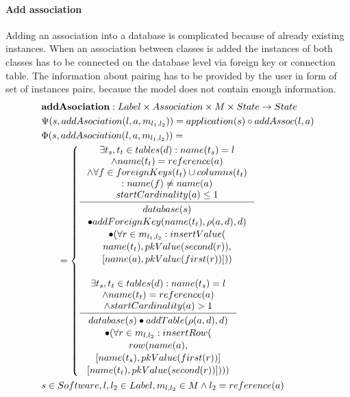 \documentclass[11pt]{article}
\begin{document}
\paragraph{Add association} Adding an association into a database is complicated because of already existing instances. When an association between classes is added the instances of both classes has to be connected on the database level via foreign key or connection table. The information about pairing has to be provided by the user in form of set of instances pairs, because the model does not contain enough information. 
\begin{align*}
& \mathbf{addAsociation} : Label \times Association \times M \times State \rightarrow State \\
& \Psi(s, addAsociation(l, a, m_{l_1, l_2})) = application(s) \circ addAssoc(l, a) \\
& \Phi(s, addAsociation(l, a, m_{l_1, l_2})) = \\
& \;\;\;\;\;\; = \begin{cases}
	\inference{ \exists t_s, t_t \in tables(d) : name(t_s) = l\\ 		\wedge name(t_t) = reference(a) \\ \wedge \forall f \in foreignKeys(t_t) \cup columns(t_t) \\: name(f) \neq name(a) \\ startCardinality(a) \leq 1}{\begin{gathered}
		database(s) \\ \bullet addForeignKey(name(t_t), \rho(a,d), d) \\ \bullet (\forall r \in m_{l_1, l_2} : 
		insertValue(\\ name(t_t), pkValue(second(r)), \\ [name(a), pkValue(first(r))]))
	\end{gathered}}
 \\ \\
	\inference{ \exists t_s, t_t \in tables(d) : name(t_s) = l \\ \wedge name(t_t) = reference(a) \\ \wedge startCardinality(a) > 1}{\begin{gathered} 
	database(s) \bullet addTable(\rho(a,d),d) \\ \bullet (\forall r \in m_{l, l_2} :
	 insertRow(\\ row(name(a), \\ [name(t_s), pkValue(first(r))]\\ [name(t_t), pkValue(second(r))])))
	\end{gathered}} 
\end{cases}\\
& s \in Software, l, l_2 \in Label, m_{l, l_2} \in M \wedge l_2 = reference(a)
\end{align*} 
\end{document}

